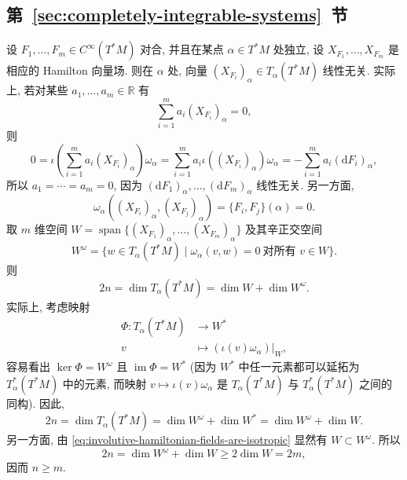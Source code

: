 \subsection{\texorpdfstring{第~\ref{sec:completely-integrable-systems}~节}{完全可积系统}}\label{subsec:solutions-completely-integrable-systems}

\begin{description}[font=\normalfont,leftmargin=2em,labelwidth=1.5em]
设 $F_1,\ldots,F_m\in C^\infty(T^*M)$ 对合, 并且在某点 $\alpha\in T^*M$ 处独立, 设 $X_{F_1},\ldots,X_{F_m}$ 是相应的 Hamilton 向量场. 则在 $\alpha$ 处, 向量 $(X_{F_i})_\alpha\in T_\alpha(T^*M)$ 线性无关. 实际上, 若对某些 $a_1,\ldots,a_m\in\mathbb{R}$ 有
\[
  \sum_{i=1}^m a_i(X_{F_i})_\alpha=0,
\]
则
\[
  0=\iota\left(\sum_{i=1}^m a_i(X_{F_i})_\alpha\right)\omega_\alpha
     =\sum_{i=1}^m a_i\iota((X_{F_i})_\alpha)\omega_\alpha
     =-\sum_{i=1}^m a_i(\mathrm{d}F_i)_\alpha,
\]
所以 $a_1=\cdots=a_m=0$, 因为 $(\mathrm{d}F_1)_\alpha,\ldots,(\mathrm{d}F_m)_\alpha$ 线性无关. 另一方面,
\begin{equation}\label{eq:involutive-hamiltonian-fields-are-isotropic}
  \omega_\alpha((X_{F_i})_\alpha,(X_{F_j})_\alpha)=\{F_i,F_j\}(\alpha)=0.
\end{equation}
取 $m$ 维空间 $W=\operatorname{span}\{(X_{F_1})_\alpha,\ldots,(X_{F_m})_\alpha\}$ 及其辛正交空间
\[
  W^\omega=\{w\in T_\alpha(T^*M)\mid
             \omega_\alpha(v,w)=0\ \text{对所有 }v\in W\}.
\]
则
\[
  2n=\dim T_\alpha(T^*M)=\dim W+\dim W^\omega.
\]
实际上, 考虑映射
\[
  \begin{aligned}
  \Phi:T_\alpha(T^*M)&\to W^*\\
                  v&\mapsto(\iota(v)\omega_\alpha)|_W,
  \end{aligned}
\]
容易看出 $\ker\Phi=W^\omega$ 且 $\operatorname{im}\Phi=W^*$ (因为 $W^*$ 中任一元素都可以延拓为 $T_\alpha^*(T^*M)$ 中的元素, 而映射 $v\mapsto\iota(v)\omega_\alpha$ 是 $T_\alpha(T^*M)$ 与 $T_\alpha^*(T^*M)$ 之间的同构). 因此,
\[
  2n=\dim T_\alpha(T^*M)=\dim W^\omega+\dim W^*=\dim W^\omega+\dim W.
\]
另一方面, 由 \eqref{eq:involutive-hamiltonian-fields-are-isotropic} 显然有 $W\subset W^\omega$. 所以
\[
  2n=\dim W^\omega+\dim W\ge2\dim W=2m,
\]
因而 $n\ge m$.


\end{description}
